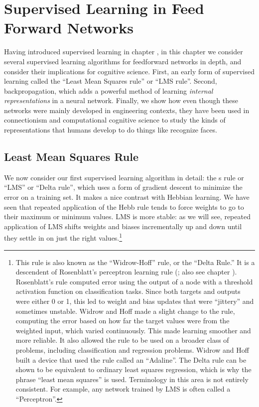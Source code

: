 \chapter{Supervised Learning in Feed Forward Networks}\label{ch_supervised_ff}
	
Having introduced supervised learning in chapter , in this chapter we consider several supervised learning algorithms for feedforward networks in depth, and consider their implications for cognitive science. First, an early form of supervised learning called the ``Least Mean Squares rule'' or ``LMS rule''. Second, backpropagation, which adds a powerful method of learning \emph{internal representations} in a neural network. Finally, we show how even though these networks were mainly developed in engineering contexts, they have been used in connectionism  and computational cognitive science to study the  kinds of representations that humans develop to do things like recognize faces.

\section{Least Mean Squares Rule}\label{lms_rule}

We now consider our first supervised learning algorithm in detail: the s rule or ``LMS'' or ``Delta rule'', which uses a form of gradient descent to minimize the error on a training set. It makes a nice contrast with Hebbian learning. We have seen that repeated application of the Hebb rule tends to force weights to go to their maximum or minimum values. LMS is more stable: as we will see, repeated application of LMS shifts weights and biases incrementally up and down until they settle in on just the right values.\footnote{This rule is also known as the ``Widrow-Hoff'' rule, or the ``Delta Rule.'' It is a descendent of Rosenblatt's perceptron learning rule (\cite{rosenblatt1960perceptron}; also see chapter ). Rosenblatt's rule computed error using the output of a node with a threshold activation function on classification tasks. Since both targets and outputs were either 0 or 1, this led to weight and bias updates that were ``jittery'' and sometimes unstable. Widrow and Hoff made a slight change to the rule, computing the error based on how far the target values were from the weighted input, which varied continuously. This made learning smoother and more reliable. It also allowed the rule to be used on a broader class of problems, including classification and regression problems. Widrow and Hoff built a device that used the rule called an ``Adaline''. The Delta rule can be shown to be equivalent to ordinary least squares regression, which is why the phrase ``least mean squares'' is used. Terminology  in this  area is not entirely consistent. For example, any network trained by LMS is often called a ``Perceptron''. }  

